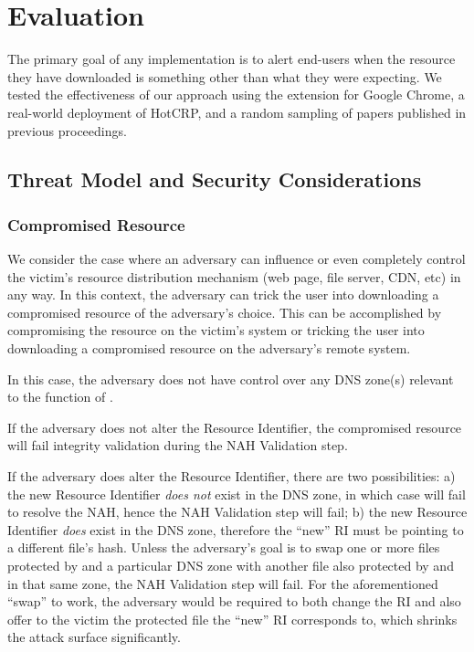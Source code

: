 \section{Evaluation} \label{sec:evaluation}

The primary goal of any \SYSTEM{} implementation is to alert end-users when the
resource they have downloaded is something other than what they were expecting.
We tested the effectiveness of our approach using the \SYSTEM{} extension for
Google Chrome, a real-world deployment of HotCRP, and a random sampling of
papers published in previous \CONFERENCE{} proceedings.

\subsection{Threat Model and Security Considerations}

\subsubsection{Compromised Resource}

We consider the case where an adversary can influence or even completely control
the victim's resource distribution mechanism (web page, file server, CDN, etc)
in any way. In this context, the adversary can trick the user into downloading a
compromised resource of the adversary's choice. This can be accomplished by
compromising the resource on the victim's system or tricking the user into
downloading a compromised resource on the adversary's remote system.

In this case, the adversary does not have control over any DNS zone(s) relevant
to the function of \SYSTEM{}.

If the adversary does not alter the Resource Identifier, the compromised
resource will fail integrity validation during the NAH Validation step.

If the adversary does alter the Resource Identifier, there are two
possibilities: a) the new Resource Identifier \textit{does not} exist in the DNS
zone, in which case \SYSTEM{} will fail to resolve the NAH, hence the NAH
Validation step will fail; b) the new Resource Identifier \textit{does} exist in
the DNS zone, therefore the ``new'' RI must be pointing to a different file's
hash. Unless the adversary's goal is to swap one or more files protected by
\SYSTEM{} and a particular DNS zone with another file also protected by
\SYSTEM{} and in that same zone, the NAH Validation step will fail. For the
aforementioned ``swap'' to work, the adversary would be required to both change
the RI and also offer to the victim the \SYSTEM{} protected file the ``new'' RI
corresponds to, which shrinks the attack surface significantly.

